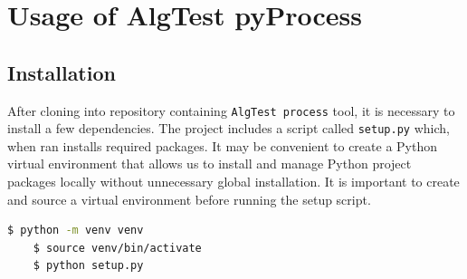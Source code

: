 \renewcommand{\thechapter}{A}
\chapter{Usage of AlgTest pyProcess}



\lstset{style=mystyle}

\section{Installation}
After cloning into repository containing \texttt{AlgTest process} tool, it is necessary to install a few dependencies. The project includes a script called \texttt{setup.py} which, when ran installs required packages. It may be convenient to create a Python virtual environment that allows us to install and manage Python project packages locally without unnecessary global installation. It is important to create and source a virtual environment before running the setup script.
\begin{lstlisting}[language=bash]
    $ python -m venv venv
    $ source venv/bin/activate
    $ python setup.py
\end{lstlisting}

